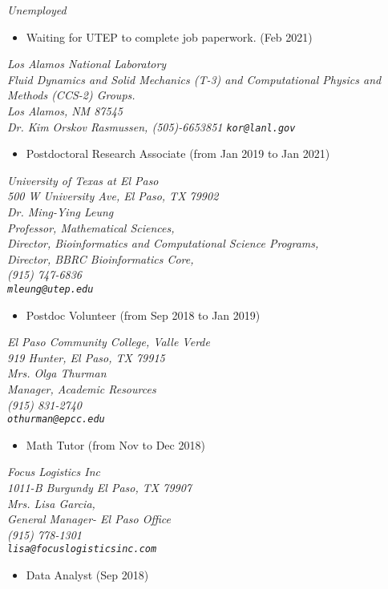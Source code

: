 \documentclass[margin]{res}
\begin{document}
\begin{resume}
{\sl Unemployed
} \hfill 
\begin{itemize}
\item  Waiting for UTEP to complete job paperwork. (Feb 2021)
\end{itemize}

{\sl Los Alamos National Laboratory \\
Fluid Dynamics and Solid Mechanics (T-3) and
Computational Physics and Methods (CCS-2) Groups.\\
Los Alamos, NM 87545\\
Dr. Kim Orskov Rasmussen, (505)-6653851
\verb+kor@lanl.gov +
} \hfill  
\begin{itemize}
\item Postdoctoral Research Associate (from Jan 2019 to Jan 2021)
\end{itemize}

{\sl University of Texas at El Paso\\
500 W University Ave, El Paso, TX  79902\\
Dr. Ming-Ying Leung\\
Professor, Mathematical Sciences,\\
Director, Bioinformatics and Computational Science Programs,\\
Director, BBRC Bioinformatics Core,\\
(915) 747-6836\\%
\verb+mleung@utep.edu+
} \hfill  
\begin{itemize}
\item Postdoc Volunteer (from Sep 2018 to Jan 2019)
\end{itemize}

{\sl El Paso Community College, Valle Verde\\
919 Hunter,  El Paso, TX 79915\\
Mrs. Olga Thurman\\
Manager, Academic Resources\\
(915) 831-2740\\
\verb+othurman@epcc.edu+
} \hfill  
\begin{itemize}
\item Math Tutor (from Nov to Dec 2018)
\end{itemize}

{\sl Focus Logistics Inc\\
1011-B Burgundy El Paso, TX 79907\\
Mrs. Lisa Garcia,\\
General Manager- El Paso Office\\
(915) 778-1301\\
\verb+lisa@focuslogisticsinc.com+
} \hfill  
\begin{itemize}
\item Data Analyst (Sep 2018)
\end{itemize}


\end{resume}
\end{document}
